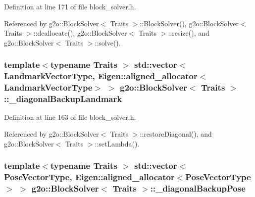 Definition at line 171 of file block\+\_\+solver.\+h.



Referenced by g2o\+::\+Block\+Solver$<$ Traits $>$\+::\+Block\+Solver(), g2o\+::\+Block\+Solver$<$ Traits $>$\+::deallocate(), g2o\+::\+Block\+Solver$<$ Traits $>$\+::resize(), and g2o\+::\+Block\+Solver$<$ Traits $>$\+::solve().

\subsubsection[{\texorpdfstring{\+\_\+diagonal\+Backup\+Landmark}{_diagonalBackupLandmark}}]{\setlength{\rightskip}{0pt plus 5cm}template$<$typename Traits $>$ std\+::vector$<${\bf Landmark\+Vector\+Type}, Eigen\+::aligned\+\_\+allocator$<${\bf Landmark\+Vector\+Type}$>$ $>$ {\bf g2o\+::\+Block\+Solver}$<$ Traits $>$\+::\+\_\+diagonal\+Backup\+Landmark\hspace{0.3cm}{\ttfamily [protected]}}\hypertarget{classg2o_1_1BlockSolver_a3bc5b19faa2c45e2c04a6743b3a083de}{}\label{classg2o_1_1BlockSolver_a3bc5b19faa2c45e2c04a6743b3a083de}


Definition at line 163 of file block\+\_\+solver.\+h.



Referenced by g2o\+::\+Block\+Solver$<$ Traits $>$\+::restore\+Diagonal(), and g2o\+::\+Block\+Solver$<$ Traits $>$\+::set\+Lambda().

\subsubsection[{\texorpdfstring{\+\_\+diagonal\+Backup\+Pose}{_diagonalBackupPose}}]{\setlength{\rightskip}{0pt plus 5cm}template$<$typename Traits $>$ std\+::vector$<${\bf Pose\+Vector\+Type}, Eigen\+::aligned\+\_\+allocator$<${\bf Pose\+Vector\+Type}$>$ $>$ {\bf g2o\+::\+Block\+Solver}$<$ Traits $>$\+::\+\_\+diagonal\+Backup\+Pose\hspace{0.3cm}{\ttfamily [protected]}}\hypertarget{classg2o_1_1BlockSolver_a3cb6f86c522c2ea26478ad44b7c32f76}{}\label{classg2o_1_1BlockSolver_a3cb6f86c522c2ea26478ad44b7c32f76}


